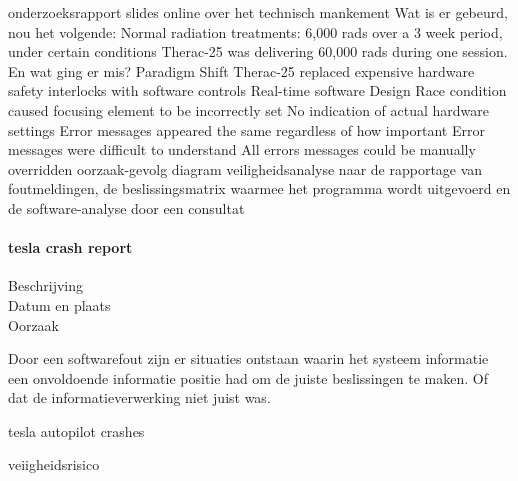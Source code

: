 onderzoeksrapport
slides online over het technisch mankement
Wat is er gebeurd, nou het volgende:
Normal radiation treatments: 6,000 rads over a 3 week period, under certain conditions Therac-25 was delivering 60,000 rads during one session.
En wat ging er mis?
Paradigm Shift
Therac-25 replaced expensive hardware safety interlocks with software controls
Real-time software
Design
Race condition caused focusing element to be incorrectly set
No indication of actual hardware settings
Error messages appeared the same regardless of how important
Error messages were difficult to understand
All errors messages could be manually overridden
oorzaak-gevolg diagram
veiligheidsanalyse naar de rapportage van foutmeldingen, de beslissingsmatrix waarmee het programma wordt uitgevoerd en de software-analyse door een consultat
\cite{stackexchange2021therac25code}






\paragraph{tesla crash report}

\begin{description}
\item[Beschrijving]
\item[Datum en plaats] 
\item[Oorzaak]
\end{description}
Door een softwarefout zijn er situaties ontstaan waarin het systeem informatie een onvoldoende informatie positie had om de juiste beslissingen te maken. Of dat de informatieverwerking niet juist was.


tesla autopilot crashes

\cite{teslaFDSCrash}
\cite{teslaCrashesCauses}
\cite{teslacrashOvervieuw}
\cite{tesladeaths}
veiigheidsrisico

